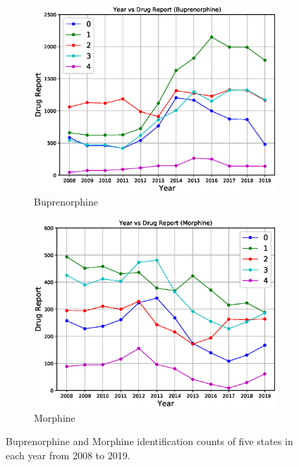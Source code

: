 \documentclass{mcmthesis}
\begin{document}
\begin{figure}[H]
    \centering
    \begin{subfigure}[b]{0.48\textwidth}
        \includegraphics[width=\textwidth]{../figure/state_Buprenorphine.eps} 
    \caption{Buprenorphine}
    \label{fig:state_Buprenorphine}
    \end{subfigure}\hfill
    \begin{subfigure}[b]{0.48\textwidth}
        \includegraphics[width=\textwidth]{../figure/state_Morphine.eps} 
	\caption{Morphine} 
	\label{fig:state_Morphine}  
    \end{subfigure}
    \caption{Buprenorphine and Morphine identification counts of five states in each year from 2008 to 2019.}
    \label{fig:state}
\end{figure}
\end{document}
